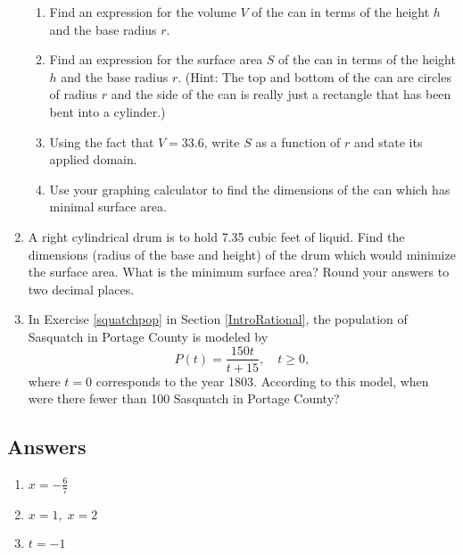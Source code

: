 \begin{enumerate}
\begin{enumerate}

\item Find an expression for the volume $V$ of the can in terms of the height $h$ and the base radius $r$.
\item Find an expression for the surface area $S$ of the can in terms of the height $h$ and the base radius $r$.  (Hint: The top and bottom of the can are circles of radius $r$ and the side of the can is really just a rectangle that has been bent into a cylinder.)
\item Using the fact that $V = 33.6$, write $S$ as a function of $r$ and state its applied domain.
\item Use your graphing calculator to find the dimensions of the can which has minimal surface area.

\end{enumerate}

\item  A right cylindrical drum is to hold 7.35 cubic feet of liquid.  Find the dimensions (radius of the base and height) of the drum which would minimize the surface area.  What is the minimum surface area?  Round your answers to two decimal places.


\item In Exercise \ref{squatchpop} in Section \ref{IntroRational}, the population of Sasquatch in Portage County is modeled by  \[P(t) = \frac{150t}{t + 15}, \quad t \geq 0,\] where $t = 0$ corresponds to the year 1803.  According to this model, when were there fewer than 100 Sasquatch in Portage County?

\setcounter{HW}{\value{enumi}}
\end{enumerate}



\newpage

\subsection{Answers}

\begin{multicols}{3} 
\begin{enumerate}

\item $x = -\frac{6}{7}$
\item $x = 1, \; x = 2$
\item $t = -1$

\setcounter{HW}{\value{enumi}}
\end{enumerate}
\end{multicols}

